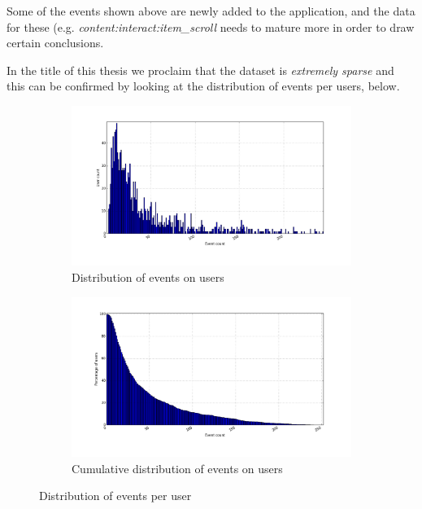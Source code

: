Some of the events shown above are newly added to the application, and the data
for these (e.g. \textit{content:interact:item\_scroll} needs to mature more in
order to draw certain conclusions.

In the title of this thesis we proclaim that the dataset is \textit{extremely
sparse} and this can be confirmed by looking at the distribution of events per
users, below.

\begin{figure}[H]
    \centering
    \begin{subfigure}{.5\textwidth}
        \centering
        \includegraphics[width=\dualGraphWidth]{image/user_iddistribution.png}
        \caption{Distribution of events on users}
        \label{fig:userEventDist}
    \end{subfigure}%
    \begin{subfigure}{.5\textwidth}
        \centering
        \includegraphics[width=\dualGraphWidth]{image/user_idcumdistribution.png}
        \caption{Cumulative distribution of events on users}
        \label{fig:userEventCumDist}
    \end{subfigure}
    \caption{Distribution of events per user}
\end{figure}

